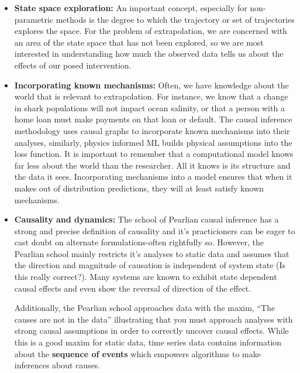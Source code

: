 \documentclass{article}
\begin{document}
        \begin{itemize}
            \item \textbf{State space exploration:} An important concept, especially for non-parametric methods is the degree to 
            which the trajectory or set of trajectories explores the space. For the problem of extrapolation, we are concerned with
            an area of the state space that has not been explored, so we are most interested in understanding how much the
            observed data tells us about the effects of our posed intervention.

            \item \textbf{Incorporating known mechanisms:} Often, we have knowledge about the world that is relevant to
            extrapolation. For instance, we know that a change in shark populations will not impact ocean salinity, or that
            a person with a home loan must make payments on that loan or default. The causal inference methodology uses
            causal graphs to incorporate known mechanisms into their analyses, similarly, physics informed ML builds
            physical assumptions into the loss function. It is important to remember that a computational model knows far
            less about the world than the researcher. All it knows is its structure and the data it sees. Incorporating
            mechanisms into a model ensures that when it makes out of distribution predictions, they will at least
            satisfy known mechanisms.

            \item \textbf{Causality and dynamics:} The school of Pearlian causal inference has a strong and precise definition of
            causality and it's practicioners can be eager to cast doubt on alternate formulations-often rightfully so.
            However, the Pearlian school mainly restricts it's analyses to static data and assumes that the direction and
            magnitude of causation is independent of system state (Is this really correct?). Many systems are known to
            exhibit state dependent causal effects and even show the reversal of direction of the effect.

            Additionally, the Pearlian school approaches data with the maxim, ``The causes are not in the data'' illustrating
            that you must approach analyses with strong causal assumptions in order to correctly uncover causal effects.
            While this is a good maxim for static data, time series data contains information about the \textbf{sequence of events}
            which empowers algorithms to make inferences about causes.


\end{itemize}
\end{document}
